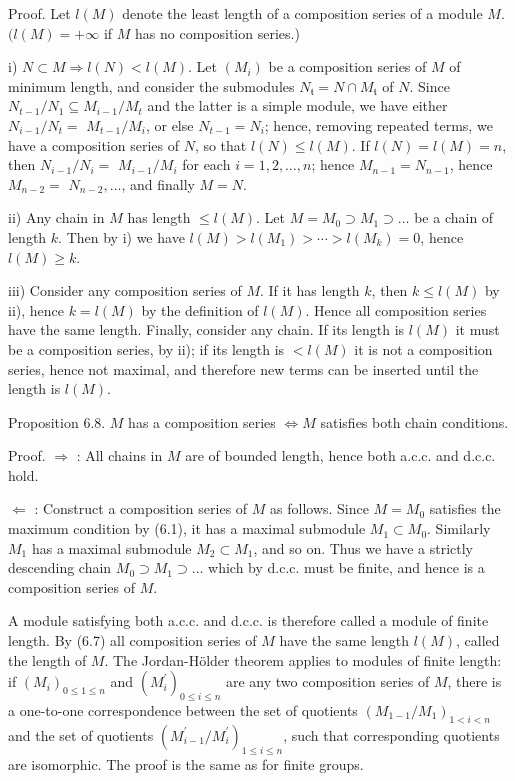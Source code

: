 \documentclass{standalone}
\theoremstyle{definition}
\theoremstyle{remark}
\begin{document}
Proof. Let $l(M)$ denote the least length of a composition series of a module $M$. $(l(M)=+\infty$ if $M$ has no composition series.)

i) $N \subset M \Rightarrow l(N)<l(M)$. Let $\left(M_{i}\right)$ be a composition series of $M$ of minimum length, and consider the submodules $N_{\mathfrak{t}}=N \cap M_{\mathfrak{t}}$ of $N$. Since $N_{t-1} / N_{1} \subseteq M_{i-1} / M_{t}$ and the latter is a simple module, we have either $N_{i-1} / N_{t}=$ $M_{t-1} / M_{i}$, or else $N_{t-1}=N_{i}$; hence, removing repeated terms, we have a composition series of $N$, so that $l(N) \leqslant l(M)$. If $l(N)=l(M)=n$, then $N_{i-1} / N_{i}=$ $M_{i-1} / M_{i}$ for each $i=1,2, \ldots, n$; hence $M_{n-1}=N_{n-1}$, hence $M_{n-2}=$ $N_{n-2}, \ldots$, and finally $M=N$.

ii) Any chain in $M$ has length $\leqslant l(M)$. Let $M=M_{0} \supset M_{1} \supset \ldots$ be a chain of length $k$. Then by i) we have $l(M)>l\left(M_{1}\right)>\cdots>l\left(M_{k}\right)=0$, hence $l(M) \geqslant k$.

iii) Consider any composition series of $M$. If it has length $k$, then $k \leqslant l(M)$ by ii), hence $k=l(M)$ by the definition of $l(M)$. Hence all composition series have the same length. Finally, consider any chain. If its length is $l(M)$ it must be a composition series, by ii); if its length is $<l(M)$ it is not a composition series, hence not maximal, and therefore new terms can be inserted until the length is $l(M)$.

Proposition 6.8. $M$ has a composition series $\Leftrightarrow M$ satisfies both chain conditions.

Proof. $\Rightarrow$ : All chains in $M$ are of bounded length, hence both a.c.c. and d.c.c. hold.

$\Leftarrow$ : Construct a composition series of $M$ as follows. Since $M=M_{0}$ satisfies the maximum condition by (6.1), it has a maximal submodule $M_{1} \subset M_{0}$. Similarly $M_{1}$ has a maximal submodule $M_{2} \subset M_{1}$, and so on. Thus we have a strictly descending chain $M_{0} \supset M_{1} \supset \ldots$ which by d.c.c. must be finite, and hence is a composition series of $M$.

A module satisfying both a.c.c. and d.c.c. is therefore called a module of finite length. By (6.7) all composition series of $M$ have the same length $l(M)$, called the length of $M$. The Jordan-Hölder theorem applies to modules of finite length: if $\left(M_{i}\right)_{0 \leqslant 1 \leqslant n}$ and $\left(M_{i}^{\prime}\right)_{0 \leqslant i \leqslant n}$ are any two composition series of $M$, there is a one-to-one correspondence between the set of quotients $\left(M_{1-1} / M_{1}\right)_{1<i<n}$ and the set of quotients $\left(M_{i-1}^{\prime} / M_{i}^{\prime}\right)_{1 \leqslant i \leqslant n}$, such that corresponding quotients are isomorphic. The proof is the same as for finite groups.
\end{document}
